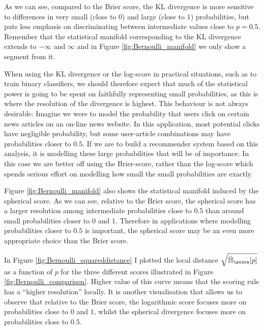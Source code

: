 As we can see, compared to the Brier score, the KL divergence is more sensitive to differences in very small (close to 0) and large (close to 1) probabilities, but puts less emphasis on discriminating between intermediate values close to $p=0.5$. Remember that the statistical manifold corresponding to the KL divergence extends to $-\infty$ and $\infty$ and in Figure \ref{fig:Bernoulli_manifold} we only show a segment from it.

When using the KL divergence or the log-score in practical situations, such as to train binary classifiers, we should therefore expect that much of the statistical power is going to be spent on faithfully representing small probabilities, as this is where the resolution of the divergence is highest. This behaviour is not always desirable: Imagine we were to model the probability that users click on certain news articles on an on-line news website. In this application, most potential clicks have negligible probability, but some user-article combinations may have probabilities closer to $0.5$. If we are to build a recommender system based on this analysis, it is modelling these large probabilities that will be of importance. In this case we are better off using the Brier-score, rather than the log-score which spends serious effort on modelling how small the small probabilities are exactly.

Figure \ref{fig:Bernoulli_manifold} also shows the statistical manifold induced by the spherical score. As we can see, relative to the Brier score, the spherical score has a larger resolution among intermediate probabilities close to $0.5$ than around small probabilities closer to $0$ and $1$. Therefore in applications where modelling probabilities closer to $0.5$ is important, the spherical score may be an even more appropriate choice than the Brier score.

In Figure \ref{fig:Bernoulli_squareddistance} I plotted the local distance $\sqrt{\ddot{\mathbb{H}}_{\score}[p]}$ as a function of $p$ for the three different scores illustrated in Figure \ref{fig:Bernoulli_comparison}. Higher value of this curve means that the scoring rule has a ``higher resolution'' locally. It is another visualisation that allows us to observe that relative to the Brier score, the logarithmic score focuses more on probabilities close to $0$ and $1$, whilst the spherical divergence focuses more on probabilities close to $0.5$.


